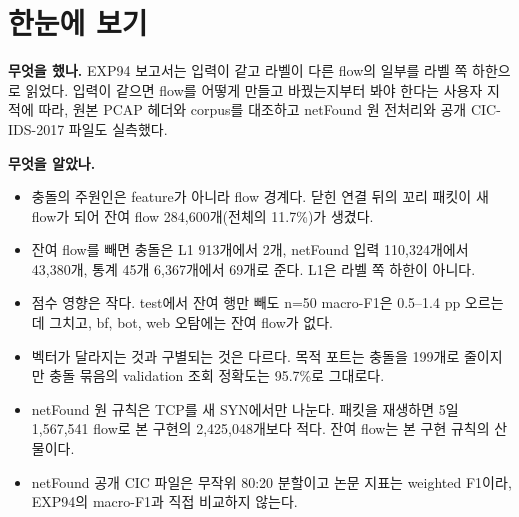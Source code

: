 
\usepackage{tabularx}


\section{한눈에 보기}
\textbf{무엇을 했나.} EXP94 보고서는 입력이 같고 라벨이 다른 flow의 일부를 라벨 쪽 하한으로 읽었다. 입력이 같으면 flow를 어떻게 만들고 바꿨는지부터 봐야 한다는 사용자 지적에 따라, 원본 PCAP 헤더와 corpus를 대조하고 netFound 원 전처리와 공개 CIC-IDS-2017 파일도 실측했다.

\textbf{무엇을 알았나.}
\begin{itemize}
\item 충돌의 주원인은 feature가 아니라 flow 경계다. 닫힌 연결 뒤의 꼬리 패킷이 새 flow가 되어 잔여 flow 284,600개(전체의 11.7\%)가 생겼다.
\item 잔여 flow를 빼면 충돌은 L1 913개에서 2개, netFound 입력 110,324개에서 43,380개, 통계 45개 6,367개에서 69개로 준다. L1은 라벨 쪽 하한이 아니다.
\item 점수 영향은 작다. test에서 잔여 행만 빼도 n=50 macro-F1은 0.5--1.4 pp 오르는 데 그치고, bf, bot, web 오탐에는 잔여 flow가 없다.
\item 벡터가 달라지는 것과 구별되는 것은 다르다. 목적 포트는 충돌을 199개로 줄이지만 충돌 묶음의 validation 조회 정확도는 95.7\%로 그대로다.
\item netFound 원 규칙은 TCP를 새 SYN에서만 나눈다. 패킷을 재생하면 5일 1,567,541 flow로 본 구현의 2,425,048개보다 적다. 잔여 flow는 본 구현 규칙의 산물이다.
\item netFound 공개 CIC 파일은 무작위 80:20 분할이고 논문 지표는 weighted F1이라, EXP94의 macro-F1과 직접 비교하지 않는다.
\end{itemize}

